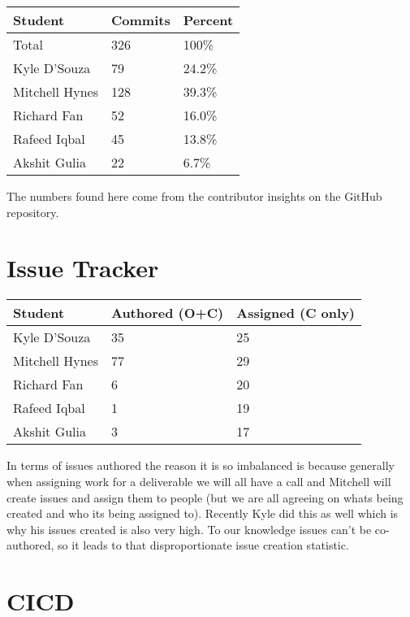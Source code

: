 \documentclass{article}
\begin{document}
\begin{table}[H]
  \centering
  \begin{tabular}{lll}
    \toprule
    \textbf{Student} & \textbf{Commits} & \textbf{Percent}\\
    \midrule
    Total & 326 & 100\% \\
    Kyle D'Souza & 79 & 24.2\% \\
    Mitchell Hynes & 128 & 39.3\% \\
    Richard Fan & 52 & 16.0\% \\
    Rafeed Iqbal & 45 & 13.8\% \\
    Akshit Gulia & 22 & 6.7\% \\
    \bottomrule
  \end{tabular}
\end{table}

The numbers found here come from the contributor insights on the
GitHub repository.

\section{Issue Tracker}

\begin{table}[H]
  \centering
  \begin{tabular}{lll}
    \toprule
    \textbf{Student} & \textbf{Authored (O+C)} & \textbf{Assigned (C only)}\\
    \midrule
    Kyle D'Souza & 35 & 25 \\
    Mitchell Hynes & 77 & 29 \\
    Richard Fan & 6 & 20 \\
    Rafeed Iqbal & 1 & 19 \\
    Akshit Gulia & 3 & 17 \\
    \bottomrule
  \end{tabular}
\end{table}

In terms of issues authored the reason it is so imbalanced is because
generally when assigning work for a deliverable we will all have a
call and Mitchell will create issues and assign them to people (but
  we are all agreeing on whats being created and who its being assigned
to). Recently Kyle did this as well which is why his issues created
is also very high. To our knowledge issues can't be co-authored, so
it leads to that disproportionate issue creation statistic.

\section{CICD}
\end{document}
